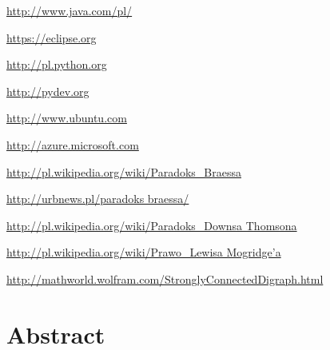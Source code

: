 \documentclass[twoside,12pt]{report}
\let\oldsection\chapter
\def\chapter{\cleardoublepage\oldsection}
\begin{document}
\begin{thebibliography}{99}
	\url{http://www.java.com/pl/}

	\url{https://eclipse.org}
				
	\url{http://pl.python.org}
	
	\url{http://pydev.org}
	
	\url{http://www.ubuntu.com}
	
	\url{http://azure.microsoft.com}
			
	\url{http://pl.wikipedia.org/wiki/Paradoks_Braessa}
	
	\url{http://urbnews.pl/paradoks braessa/}
	
	\url{http://pl.wikipedia.org/wiki/Paradoks_Downsa Thomsona}
	
	\href{http://pl.wikipedia.org/wiki/Prawo_Lewisa Mogridge\%E2\%80\%99a}
	    {http://pl.wikipedia.org/wiki/Prawo\_Lewisa Mogridge\textquoteright{}a}
	   
	\url{http://mathworld.wolfram.com/StronglyConnectedDigraph.html}

\end{thebibliography}

\cleardoublepage
{}
{}
\chapter*{Abstract}
\end{document}
